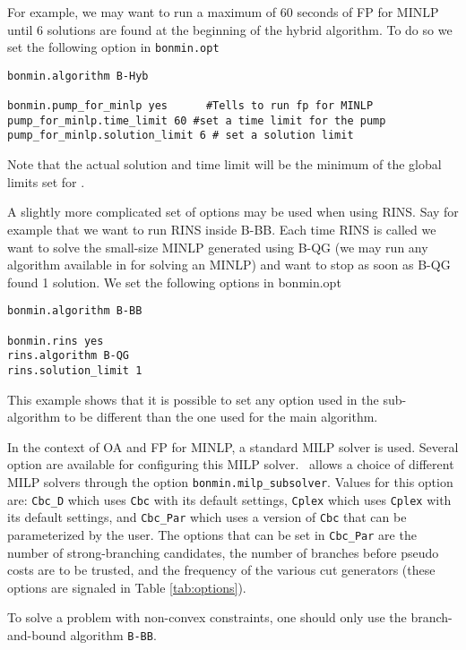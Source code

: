 For example, we may want to run a maximum of 60 seconds of FP for MINLP until 6 solutions are found at the beginning of the hybrid algorithm. To do so 
we set the following option in {\tt bonmin.opt}
\begin{verbatim}
bonmin.algorithm B-Hyb

bonmin.pump_for_minlp yes      #Tells to run fp for MINLP
pump_for_minlp.time_limit 60 #set a time limit for the pump
pump_for_minlp.solution_limit 6 # set a solution limit

\end{verbatim}

Note that the actual solution and time limit will be the minimum of the global limits set for \Bonmin.

A slightly more complicated set of options may be used when using RINS. Say for example that we want to run RINS inside B-BB. Each time RINS is called we want
to solve the small-size MINLP generated using B-QG (we may run any algorithm available in \Bonmin for solving an MINLP) and want to stop as soon as B-QG found 1 solution.
We set the following options in bonmin.opt

\begin{verbatim}
bonmin.algorithm B-BB

bonmin.rins yes
rins.algorithm B-QG
rins.solution_limit 1

\end{verbatim}
This example shows that it is possible to set any option used in the sub-algorithm to be different than the one used for the main algorithm.


In the context of OA and FP for MINLP, a standard MILP solver is used.
Several option are available for configuring this MILP solver.
\Bonmin\ allows a choice of different MILP solvers through the option
{\tt bonmin.milp\_subsolver}. Values for this option are: {\tt Cbc\_D} which uses {\tt Cbc} with its
default settings, {\tt Cplex} which uses {\tt Cplex} with its default settings, and
{\tt Cbc\_Par} which uses a version of {\tt Cbc} that can be parameterized by the user.
The options that can be set in {\tt Cbc\_Par} are the number of strong-branching candidates,
the number of branches before pseudo costs are to be trusted, and the frequency of the various cut generators
(these options are signaled in Table \ref{tab:options}).

\label{sec:non_convex}
To solve a problem with non-convex constraints, one should only use the branch-and-bound algorithm {\tt B-BB}.


